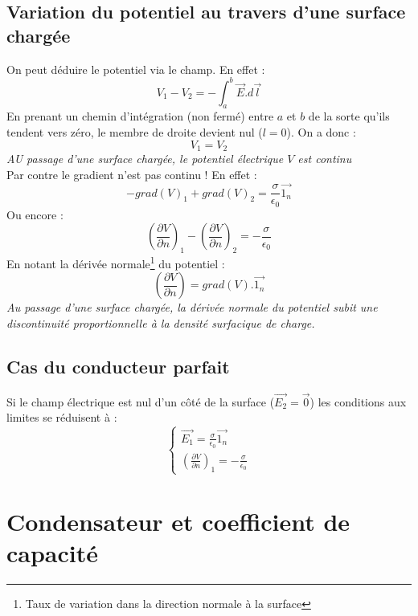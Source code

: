 \documentclass	[11pt, a4paper, openany]{book}
\begin{document}
\subsection{Variation du potentiel au travers d'une surface chargée}
On peut déduire le potentiel via le champ. En effet :
\begin{equation}
V_1 - V_2 = - \int_a^b \vec{E}.d\vec{l}
\end{equation}
En prenant un chemin d'intégration (non fermé) entre $a$ et $b$ de la sorte qu'ils tendent vers zéro, le membre de droite devient nul ($l = 0$). On a donc :
\begin{equation}
V_1 = V_2
\end{equation}
\textit{AU passage d'une surface chargée, le potentiel électrique $V$ est continu}\\

Par contre le gradient n'est pas continu ! En effet :
\begin{equation}
-grad(V)_1 + grad(V)_2 = \frac{\sigma}{\epsilon_0}\vec{1_n}
\end{equation}
Ou encore :
\begin{equation}
\left(\frac{\partial V}{\partial n}\right)_1 - \left(\frac{\partial V}{\partial n}\right)_2 = -\frac{\sigma}{\epsilon_0}
\end{equation}
En notant la dérivée normale\footnote{Taux de variation dans la direction normale à la surface} du potentiel :
\begin{equation}
\left(\frac{\partial V}{\partial n}\right) = grad(V).\vec{1_n}
\end{equation}
\textit{Au passage d'une surface chargée, la dérivée normale du potentiel subit une discontinuité proportionnelle à la densité surfacique de charge.}

\subsection{Cas du conducteur parfait}
Si le champ électrique est nul d'un côté de la surface ($\vec{E_2} = \vec{0}$) les conditions aux limites se réduisent à  : 
\begin{equation}
\left\{\begin{array}{l}
\vec{E_1} = \frac{\sigma}{\epsilon_0}\vec{1_n}\\
\left(\frac{\partial V}{\partial n}\right)_1 = -\frac{\sigma}{\epsilon_0}
\end{array}\right.
\end{equation}


\section{Condensateur et coefficient de capacité}
\end{document}
